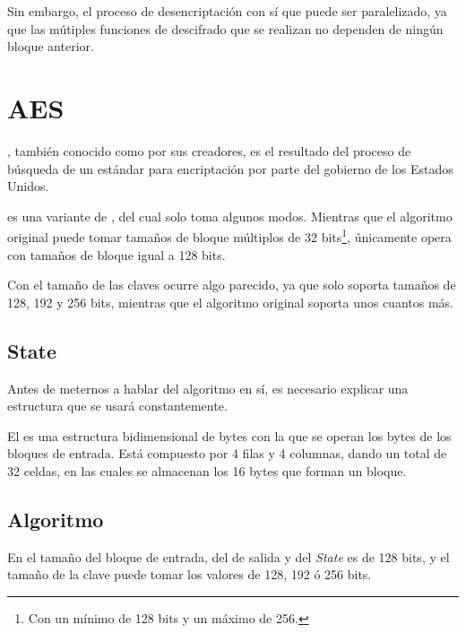  Sin embargo, el proceso de desencriptación con  sí que puede ser paralelizado,
 ya que las mútiples funciones de descifrado que se realizan no dependen de ningún bloque anterior. \emph{\parencite{Reference24}}


 \section{AES}

 , también conocido como  por sus creadores,
 es el resultado del proceso de búsqueda de un estándar para encriptación por parte del gobierno de los Estados Unidos.

  es una variante de , del cual solo toma algunos modos.
 Mientras que el algoritmo original puede tomar tamaños de bloque múltiplos de 32 bits\footnote{Con un mínimo de 128 bits y un máximo de 256.},
  únicamente opera con tamaños de bloque igual a 128 bits.

 Con el tamaño de las claves ocurre algo parecido, ya que  solo soporta tamaños de 128, 192 y 256 bits,
 mientras que el algoritmo original soporta unos cuantos más. \emph{\parencite{Reference25}}

 \subsection{State}

 Antes de meternos a hablar del algoritmo en sí, es necesario explicar una estructura que se usará
 constantemente.

 El  es una estructura bidimensional de bytes con la que se operan los bytes
 de los bloques de entrada. Está compuesto por 4 filas y 4 columnas, dando un total de 32 celdas,
 en las cuales se almacenan los 16 bytes que forman un bloque. \emph{\parencite{Reference26}}

 \subsection{Algoritmo}

 En  el tamaño del bloque de entrada, del de salida y del \emph{State} es de 128 bits,
 y el tamaño de la clave puede tomar los valores de 128, 192 ó 256 bits.

